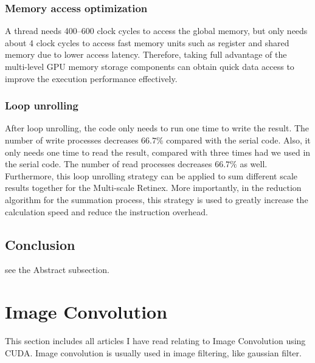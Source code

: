 \subsubsection{Memory access optimization}
A thread needs 400–600 clock cycles to access the
global memory, but only needs about 4 clock cycles to
access fast memory units such as register and shared
memory due to lower access latency. Therefore, taking
full advantage of the multi-level GPU memory storage
components can obtain quick data access to improve
the execution performance effectively.

\subsubsection{Loop unrolling}
After loop unrolling, the code only needs to run one time to
write the result. The number of write processes decreases
$66.7 \%$ compared with the serial code. Also, it only needs
one time to read the result, compared with three times had
we used in the serial code. The number of read processes
decreases $66.7 \% $ as well. Furthermore, this loop unrolling
strategy can be applied to sum different scale results
together for the Multi-scale Retinex. More importantly, in
the reduction algorithm for the summation process, this
strategy is used to greatly increase the calculation speed
and reduce the instruction overhead.
\subsection{Conclusion}
see the Abstract subsection.

\section{Image Convolution}
This section includes all articles I have read relating to Image Convolution using CUDA.
Image convolution is usually used in image filtering, like gaussian filter.
